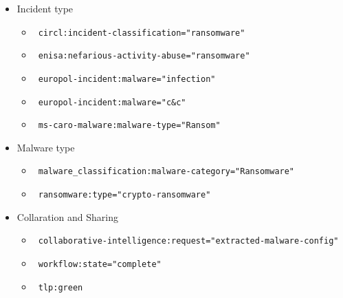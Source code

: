 \begin{frame}
    \begin{itemize}
        \item Incident type
        \begin{itemize}
            \item \texttt{\color{black} circl:incident-classification="ransomware"}
            \item \texttt{\color{black} enisa:nefarious-activity-abuse="ransomware"}
            \item \texttt{\color{black} europol-incident:malware="infection"}
            \item \texttt{\color{black} europol-incident:malware="c\&c"}
            \item \texttt{\color{black} ms-caro-malware:malware-type="Ransom"}
        \end{itemize}
        \item Malware type
        \begin{itemize}
            \item \texttt{\color{black} \scriptsize malware\_classification:malware-category="Ransomware"}
            \item \texttt{\color{black} ransomware:type="crypto-ransomware"}
        \end{itemize}
        \item Collaration and Sharing
        \begin{itemize}
            \item \texttt{\color{black} \tiny collaborative-intelligence:request="extracted-malware-config"}
            \item \texttt{\color{black} workflow:state="complete"}
            \item \texttt{\color{black} tlp:green}
        \end{itemize}
    \end{itemize}
\end{frame}

